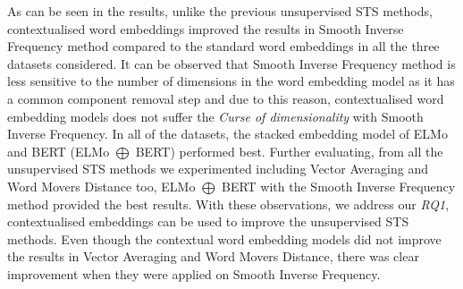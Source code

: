 \begin{enumerate}
\begin{table}[htb]
	\centering
	\caption[Results for QUORA with Smooth Inverse Frequency]{Results for QUORA dataset with Smooth Inverse Frequency. For each word embedding model, Root Mean Squared Error (RMSE) is reported. $\bigoplus$ indicates a stacked word embedding model. Best result is marked with ${\dagger}$.}  
	\label{tab:quora_smooth_inverse}
\end{table}


As can be seen in the results, unlike the previous unsupervised STS methods, contextualised word embeddings improved the results in Smooth Inverse Frequency method compared to the standard word embeddings in all the three datasets considered. It can be observed that Smooth Inverse Frequency method is less sensitive to the number of dimensions in the word embedding model as it has a common component removal step and due to this reason, contextualised word embedding models does not suffer the \textit{Curse of dimensionality} \cite{10.1145/276698.276876} with Smooth Inverse Frequency. In all of the datasets, the stacked embedding model of ELMo and BERT (ELMo $\bigoplus$ BERT) performed best. Further evaluating, from all the unsupervised STS methods we experimented including Vector Averaging and Word Movers Distance too, ELMo $\bigoplus$ BERT with the Smooth Inverse Frequency method provided the best results. With these observations, we address our \textit{RQ1}, contextualised embeddings can be used to improve the unsupervised STS methods. Even though the contextual word embedding models did not improve the results in Vector Averaging and Word Movers Distance, there was clear improvement when they were applied on Smooth Inverse Frequency. 


\end{enumerate}
